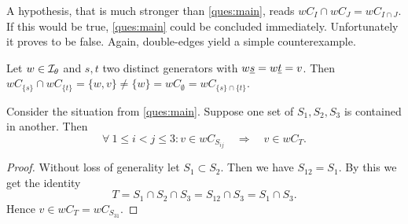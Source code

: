 A hypothesis, that is much stronger than \ref{ques:main}, reads $wC_I \cap wC_J = wC_{I \cap J}$. If this would be true, \ref{ques:main} could be concluded immediately. Unfortunately it proves to be false. Again, double-edges yield a simple counterexample.

\begin{exam}
	Let $w \in \mathcal{I}_{\theta}$ and $s,t$ two distinct generators with $w \underline{s} = w \underline{t} = v$. Then $wC_{\{s\}} \cap wC_{\{t\}} = \{w,v\} \neq \{w\} = wC_{\emptyset} = wC_{\{s\} \cap \{t\}}$.
\end{exam}

\begin{prop}
	Consider the situation from \ref{ques:main}. Suppose one set of $S_1,S_2,S_3$ is contained in another. Then
	$$ \forall \ 1 \leq i < j \leq 3 : v \in w C_{S_{ij}} \quad \Rightarrow \quad v \in w C_T. $$

	\begin{proof}
		Without loss of generality let $S_1 \subset S_2$. Then we have $S_{12} = S_1$. By this we get the identity
		$$ T = S_1 \cap S_2 \cap S_3 = S_{12} \cap S_3 = S_1 \cap S_3. $$
		Hence $v \in w C_T = w C_{S_{31}}$.
	\end{proof}
\end{prop}


